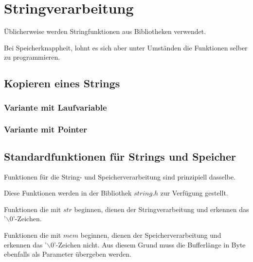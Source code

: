 \section{Stringverarbeitung}
	\begin{compactitem}
		\item Üblicherweise werden Stringfunktionen aus Bibliotheken verwendet.
		\item Bei Speicherknappheit, lohnt es sich aber unter Umständen die Funktionen selber zu programmieren.
	\end{compactitem}
	
	\subsection{Kopieren eines Strings }
		\begin{minipage}[t]{9 cm}
			\subsubsection{Variante mit Laufvariable}
				
		\end{minipage}
		\hspace*{0.5cm}
		\begin{minipage}[t]{9 cm}
			\subsubsection{Variante mit Pointer}
				
		\end{minipage}
		
	\subsection{Standardfunktionen für Strings und Speicher }
		\begin{compactitem}
			\item Funktionen für die String- und Speicherverarbeitung sind prinzipiell dasselbe.
			\item Diese Funktionen werden in der Bibliothek $string.h$ zur Verfügung gestellt.
			\item Funktionen die mit $str$ beginnen, dienen der Stringverarbeitung und erkennen das '$\backslash0$'-Zeichen.
			\item Funktionen die mit $mem$ beginnen, dienen der Speicherverarbeitung und erkennen das '$\backslash0$'-Zeichen nicht. Aus diesem Grund muss die Bufferlänge in Byte ebenfalls als Parameter übergeben werden.
		\end{compactitem}
		
